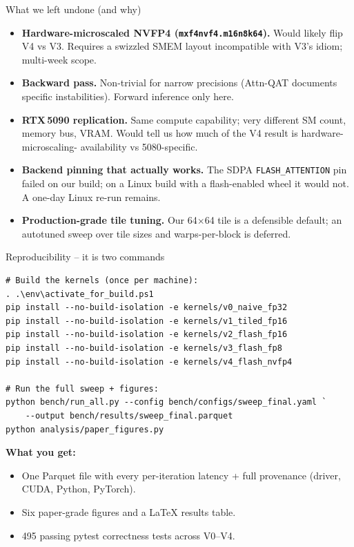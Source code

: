\documentclass[10pt,aspectratio=169]{beamer}
\begin{document}
\begin{frame}{What we left undone (and why)}
  \begin{itemize}
    \item \textbf{Hardware-microscaled NVFP4
          (\texttt{mxf4nvf4.m16n8k64}).} Would likely flip V4 vs V3.
          Requires a swizzled SMEM layout incompatible with V3's
          idiom; multi-week scope.
    \item \textbf{Backward pass.} Non-trivial for narrow precisions
          (Attn-QAT documents specific instabilities). Forward
          inference only here.
    \item \textbf{RTX\,5090 replication.} Same compute capability;
          very different SM count, memory bus, VRAM. Would tell us
          how much of the V4 result is hardware-microscaling-
          availability vs 5080-specific.
    \item \textbf{Backend pinning that actually works.} The SDPA
          \texttt{FLASH\_ATTENTION} pin failed on our build; on a
          Linux build with a flash-enabled wheel it would not. A
          one-day Linux re-run remains.
    \item \textbf{Production-grade tile tuning.} Our 64$\times$64
          tile is a defensible default; an autotuned sweep over tile
          sizes and warps-per-block is deferred.
  \end{itemize}
\end{frame}

\begin{frame}[fragile]{Reproducibility -- it is two commands}
  \begin{lstlisting}
# Build the kernels (once per machine):
. .\env\activate_for_build.ps1
pip install --no-build-isolation -e kernels/v0_naive_fp32
pip install --no-build-isolation -e kernels/v1_tiled_fp16
pip install --no-build-isolation -e kernels/v2_flash_fp16
pip install --no-build-isolation -e kernels/v3_flash_fp8
pip install --no-build-isolation -e kernels/v4_flash_nvfp4

# Run the full sweep + figures:
python bench/run_all.py --config bench/configs/sweep_final.yaml `
    --output bench/results/sweep_final.parquet
python analysis/paper_figures.py
  \end{lstlisting}
  \vspace{0.3em}
  \begin{aha}
    \textbf{What you get:}
    \begin{itemize}
      \item One Parquet file with every per-iteration latency + full
            provenance (driver, CUDA, Python, PyTorch).
      \item Six paper-grade figures and a LaTeX results table.
      \item 495 passing pytest correctness tests across V0--V4.
    \end{itemize}
  \end{aha}
\end{frame}
\end{document}
